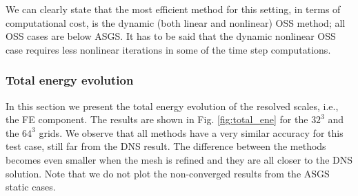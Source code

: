 We can clearly state that the most efficient method for this setting, in terms of computational cost, is the dynamic (both linear and nonlinear) OSS method; all OSS cases are below ASGS. It has to be said that the dynamic nonlinear OSS case requires less nonlinear iterations in some of the time step computations.

\subsubsection{Total energy evolution}
\label{subsubsec-C4_Total_ene_DHIT}
In this section we present the total energy evolution of the resolved scales, i.e., the FE component. The results are shown in Fig. \ref{fig:total_ene} for the $32^3$ and the $64^3$ grids. We observe that all methods have a very similar accuracy for this test case, still far from the DNS result. The difference between the methods becomes even smaller when the mesh is refined and they are all closer to the DNS solution. Note that we do not plot the non-converged results from the ASGS static cases.



